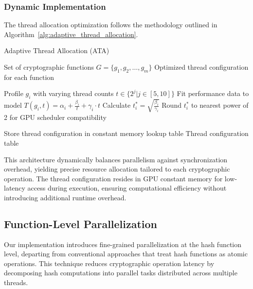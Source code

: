 \documentclass[journal]{IEEEtran}
\begin{document}
\subsubsection{Dynamic Implementation}

The thread allocation optimization follows the methodology outlined in Algorithm~\ref{alg:adaptive_thread_allocation}.

\begin{algorithm}
  \caption{Adaptive Thread Allocation (ATA)}
  \label{alg:adaptive_thread_allocation}
  \begin{algorithmic}[1]
    \REQUIRE Set of cryptographic functions $G = \{g_1, g_2, \ldots, g_m\}$
    \ENSURE Optimized thread configuration for each function

    \STATE Profile $g_i$ with varying thread counts $t \in \{2^j | j \in [5, 10]\}$
    \STATE Fit performance data to model $T(g_i, t) = \alpha_i + \frac{\beta_i}{t} + \gamma_i \cdot t$
    \STATE Calculate $t_i^* = \sqrt{\frac{\beta_i}{\gamma_i}}$
    \STATE Round $t_i^*$ to nearest power of 2 for GPU scheduler compatibility
    \ENDFOR

    \STATE Store thread configuration in constant memory lookup table
    \RETURN Thread configuration table
  \end{algorithmic}
\end{algorithm}

This architecture dynamically balances parallelism against synchronization overhead, yielding precise resource allocation tailored to each cryptographic operation. The thread configuration resides in GPU constant memory for low-latency access during execution, ensuring computational efficiency without introducing additional runtime overhead.

\subsection{Function-Level Parallelization}

Our implementation introduces fine-grained parallelization at the hash function level, departing from conventional approaches that treat hash functions as atomic operations. This technique reduces cryptographic operation latency by decomposing hash computations into parallel tasks distributed across multiple threads.

\end{document}
